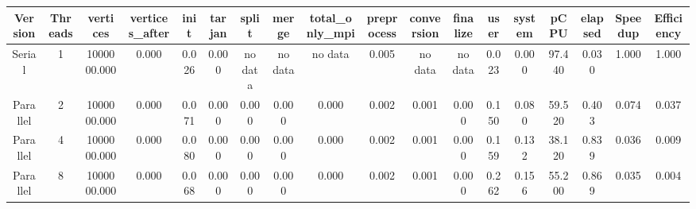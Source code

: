 \begin{tabular}{|c|c|c|c|c|c|c|c|c|c|c|c|c|c|c|c|c|c|}
\toprule
 Version &  Threads &    vertices &  vertices\_after &  init &  tarjan &   split &   merge & total\_only\_mpi &  preprocess & conversion & finalize &  user &  system &   pCPU &  elapsed &  Speedup &  Efficiency \\
\midrule
  Serial &        1 & 1000000.000 &           0.000 & 0.026 &   0.000 & no data & no data &        no data &       0.005 &    no data &  no data & 0.023 &   0.000 & 97.440 &    0.030 &    1.000 &       1.000 \\
Parallel &        2 & 1000000.000 &           0.000 & 0.071 &   0.000 &   0.000 &   0.000 &          0.000 &       0.002 &      0.001 &    0.000 & 0.150 &   0.080 & 59.520 &    0.403 &    0.074 &       0.037 \\
Parallel &        4 & 1000000.000 &           0.000 & 0.080 &   0.000 &   0.000 &   0.000 &          0.000 &       0.002 &      0.001 &    0.000 & 0.159 &   0.132 & 38.120 &    0.839 &    0.036 &       0.009 \\
Parallel &        8 & 1000000.000 &           0.000 & 0.068 &   0.000 &   0.000 &   0.000 &          0.000 &       0.002 &      0.001 &    0.000 & 0.262 &   0.156 & 55.200 &    0.869 &    0.035 &       0.004 \\
\bottomrule
\end{tabular}
